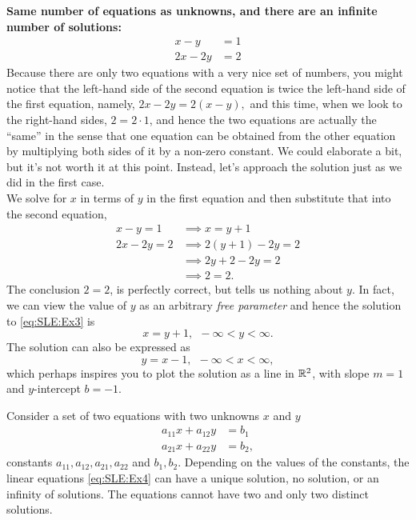 \noindent \textbf{Same number of equations as unknowns, and there are an infinite number of solutions:}
\begin{equation}
\label{eq:SLE:Ex3}
\begin{aligned}
x-y &=1 \\
2x-2y&=2
\end{aligned}
\end{equation}
Because there are only two equations with a very nice set of numbers, you might notice that the left-hand side of the second equation is twice the left-hand side of the first equation, namely, $2 x - 2y = 2(x-y),$ and this time, when we look to the right-hand sides, $2= 2 \cdot 1$, and hence the two equations are actually the ``same'' in the sense that one equation can be obtained from the other equation by multiplying both sides of it by a non-zero constant. We could elaborate a bit, but it's not worth it at this point. Instead, let's approach the solution just as we did in the first case.\\

We solve for $x$ in terms of $y$ in the first equation and then substitute that into the second equation,
\begin{align*}
x-y =1 & \implies x = y+1\\
2x-2y=2 & \implies 2(y+1)-2y=2\\
& \implies 2y + 2 - 2y =2 \\
& \implies 2 = 2.
\end{align*}
The conclusion $2=2$, is perfectly correct, but tells us nothing about $y$. In fact, we can view the value of $y$ as an arbitrary \textit{free parameter} and hence the solution to \eqref{eq:SLE:Ex3} is 
$$x=y+1,~~ -\infty < y < \infty.$$
The solution can also be expressed as
$$ y = x-1,~~ -\infty < x < \infty,$$
which perhaps inspires you to plot the solution as a line in $\mathbb R^2$, with slope $m=1$ and $y$-intercept $b=-1$.\\



\begin{tcolorbox}[sharp corners, colback=green!30, colframe=green!80!blue, title=\textbf{\large Summary So Far}]
Consider a set of two equations with two unknowns $x$ and $y$
\begin{equation}
\label{eq:SLE:Ex4}
\begin{aligned}
a_{11}x + a_{12}y &=b_1 \\
a_{21}x + a_{22}y&=b_2,
\end{aligned}
\end{equation}
constants $a_{11}, a_{12}, a_{21}, a_{22}$ and $b_1, b_2$. Depending on the values of the constants, the linear equations \eqref{eq:SLE:Ex4} can have a unique solution, no solution, or an infinity of solutions. The equations cannot have two and only two distinct solutions. 
\end{tcolorbox}

